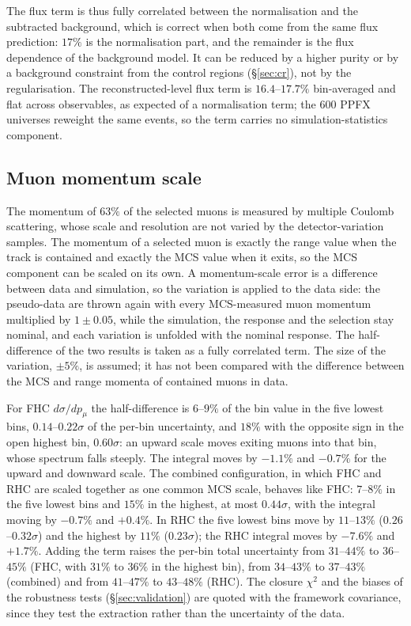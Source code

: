 \documentclass[11pt,a4paper]{article}
\begin{document}
The flux term is thus fully correlated between the normalisation and the subtracted background,
which is correct when both come from the same flux prediction: $17\%$ is the normalisation part,
and the remainder is the flux dependence of the background model. It can be reduced by a higher
purity or by a background constraint from the control regions (\S\ref{sec:cr}), not by the
regularisation. The reconstructed-level flux term is $16.4$--$17.7\%$ bin-averaged and flat across
observables, as expected of a normalisation term; the $600$ PPFX universes reweight the same
events, so the term carries no simulation-statistics component.

\subsection{Muon momentum scale}
\label{sec:mcs}

The momentum of $63\%$ of the selected muons is measured by multiple Coulomb scattering, whose scale
and resolution are not varied by the detector-variation samples. The momentum of a selected muon is
exactly the range value when the track is contained and exactly the MCS value when it exits, so
the MCS component can be scaled on its own. A momentum-scale error is a difference between data and
simulation, so the variation is applied to the data side: the pseudo-data are thrown again with every
MCS-measured muon momentum multiplied by $1\pm0.05$, while the simulation, the response and the
selection stay nominal, and each variation is unfolded with the nominal response. The
half-difference of the two results is taken as a fully correlated term. The size of the variation,
$\pm5\%$, is assumed; it has not been compared with the difference between the MCS and range momenta
of contained muons in data.

For FHC $d\sigma/dp_\mu$ the half-difference is $6$--$9\%$ of the bin value in the five lowest
bins, $0.14$--$0.22\sigma$ of the per-bin uncertainty, and $18\%$ with the opposite sign in the open
highest bin, $0.60\sigma$: an upward scale moves exiting muons into that bin, whose spectrum falls
steeply. The integral moves by $-1.1\%$ and $-0.7\%$ for the upward and downward scale. The combined
configuration, in which FHC and RHC are scaled together as one common MCS scale, behaves like FHC:
$7$--$8\%$ in the five lowest bins and $15\%$ in the highest, at most $0.44\sigma$, with the integral
moving by $-0.7\%$ and $+0.4\%$. In RHC the five lowest bins move by $11$--$13\%$
($0.26$--$0.32\sigma$) and the highest by $11\%$ ($0.23\sigma$); the RHC integral moves by $-7.6\%$
and $+1.7\%$. Adding the term raises the per-bin total uncertainty from $31$--$44\%$ to $36$--$45\%$
(FHC, with $31\%$ to $36\%$ in the highest bin), from $34$--$43\%$ to $37$--$43\%$ (combined) and
from $41$--$47\%$ to $43$--$48\%$ (RHC). The closure $\chi^2$ and the
biases of the robustness tests (\S\ref{sec:validation}) are quoted with the framework covariance,
since they test the extraction rather than the uncertainty of the data.
\end{document}
